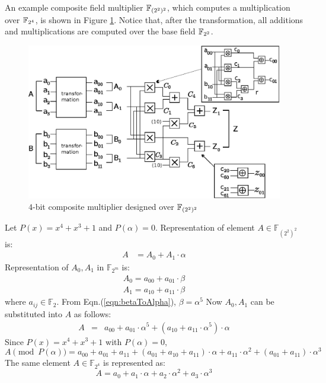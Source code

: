 \begin{Example}\label{ex:comp22}
An example composite field multiplier ${\mathbb{F}}_{(2^2)^2}$, which computes a multiplication
over ${\mathbb{F}}_{2^4}$, is shown in Figure \ref{fig:comp4ex}. Notice that, after the transformation,
all additions and multiplications are computed over the base field ${\mathbb{F}}_{2^2}$.

\begin{figure}[t]
        \centering
        \includegraphics[width=.9\linewidth]{./figures/compMineSmall}
        \caption{$4$-bit composite multiplier designed over ${\mathbb{F}}_{(2^2)^2}$}\label{fig:comp4ex}
\end{figure}

Let $P(x) = x^4 + x^3 + 1$ and $P(\alpha)=0$. 
Representation of element $A \in \mathbb{F}_{(2^2)^2}$ is:
\begin{eqnarray}
A& = A_0 +A_1 \cdot \alpha
\end{eqnarray}
Representation of $A_0, A_1$ in $\mathbb{F}_{2^m}$ is:
\begin{eqnarray}
A_0=a_{00}+a_{01} \cdot \beta \nonumber \\
A_1=a_{10}+a_{11} \cdot \beta
\end{eqnarray}
where $a_{ij}\in \mathbb{F}_2$. From Eqn.(\ref{eqn:betaToAlpha}), $\beta=\alpha^5$
Now $A_0, A_1$ can be substituted into $A$ as follows:
\begin{eqnarray}
A&=&a_{00}+a_{01}\cdot \alpha^5+(a_{10}+a_{11}\cdot \alpha^5)\cdot \alpha
\end{eqnarray}
Since $P(x)=x^4+x^3+1$ with $P(\alpha)=0$,
\begin{equation}\label{a}
A \pmod {P(\alpha)}=a_{00}+a_{01}+a_{11}+(a_{01}+a_{10}+a_{11})\cdot \alpha+a_{1
1} \cdot \alpha^2+(a_{01}+a_{11})\cdot \alpha^3   
\end{equation}
The same element $A \in \mathbb{F}_{2^4}$ is represented as:
\begin{equation}\label{aa}
A=a_0+a_1\cdot \alpha+a_2\cdot \alpha^2+a_3\cdot \alpha^3 
\end{equation}


\end{Example}
